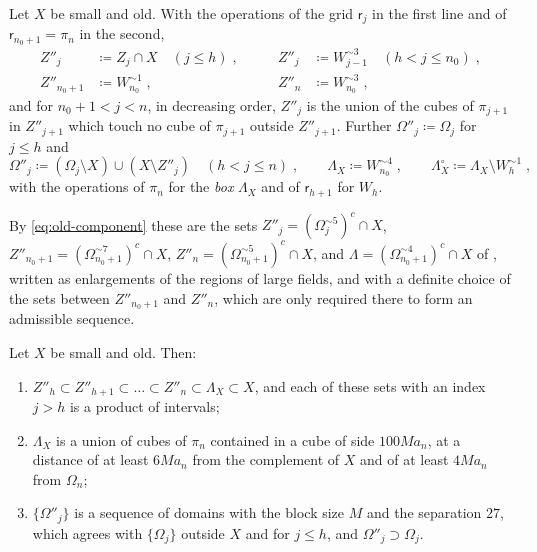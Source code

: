 \documentclass[11pt]{preprint}
\numberwithin{equation}{section}
\begin{document}
\begin{definition}\label{def:reduced-regions}
Let $X$ be small and old. With the operations of the grid $\mathsf r_j$ in the first line and of $\mathsf r_{n_0+1} = \pi_n$ in the second,
\begin{equation}\label{eq:reduced-regions}
\begin{aligned}
    Z''_j &\coloneqq Z_j \cap X \quad (j \leqslant h)\;,
    &\qquad
    Z''_j &\coloneqq W_{j-1}^{\sim3} \quad (h < j \leqslant n_0)\;,\\
    Z''_{n_0+1} &\coloneqq W_{n_0}^{\sim1}\;,
    &\qquad
    Z''_n &\coloneqq W_{n_0}^{\sim3}\;,
\end{aligned}
\end{equation}
and for $n_0 + 1 < j < n$, in decreasing order, $Z''_j$ is the union of the cubes of $\pi_{j+1}$ in $Z''_{j+1}$ which touch no cube of $\pi_{j+1}$ outside $Z''_{j+1}$. Further $\Omega''_j \coloneqq \Omega_j$ for $j \leqslant h$ and
\begin{equation}\label{eq:reduced-domains}
    \Omega''_j \coloneqq (\Omega_j \setminus X) \cup (X \setminus Z''_j) \quad (h < j \leqslant n)\;,
    \qquad
    \Lambda_X \coloneqq W_{n_0}^{\sim4}\;,
    \qquad
    \Lambda^\circ_X \coloneqq \Lambda_X \setminus W_h^{\sim1}\;,
\end{equation}
with the operations of $\pi_n$ for the \emph{box} $\Lambda_X$ and of $\mathsf r_{h+1}$ for $W_h$.
\end{definition}

By \eqref{eq:old-component} these are the sets $Z''_j = (\Omega^{\sim5}_j)^c \cap X$, $Z''_{n_0+1} = (\Omega^{\sim7}_{n_0+1})^c \cap X$, $Z''_n = (\Omega^{\sim5}_{n_0+1})^c \cap X$, and $\Lambda = (\Omega^{\sim4}_{n_0+1})^c \cap X$ of \cite[(1.10)--(1.12), (1.73)]{BalabanLFR1}, written as enlargements of the regions of large fields, and with a definite choice of the sets between $Z''_{n_0+1}$ and $Z''_n$, which are only required there to form an admissible sequence.

\begin{lemma}\label{lem:reduced-regions}
Let $X$ be small and old. Then:
\begin{enumerate}[label=(\roman*)]
\item $Z''_h \subset Z''_{h+1} \subset \dots \subset Z''_n \subset \Lambda_X \subset X$, and each of these sets with an index $j > h$ is a product of intervals;
\item $\Lambda_X$ is a union of cubes of $\pi_n$ contained in a cube of side $100Ma_n$, at a distance of at least $6Ma_n$ from the complement of $X$ and of at least $4Ma_n$ from $\Omega_n$;
\item $\{ \Omega''_j \}$ is a sequence of domains with the block size $M$ and the separation $27$, which agrees with $\{ \Omega_j \}$ outside $X$ and for $j \leqslant h$, and $\Omega''_j \supset \Omega_j$.
\end{enumerate}
\end{lemma}
\end{document}
